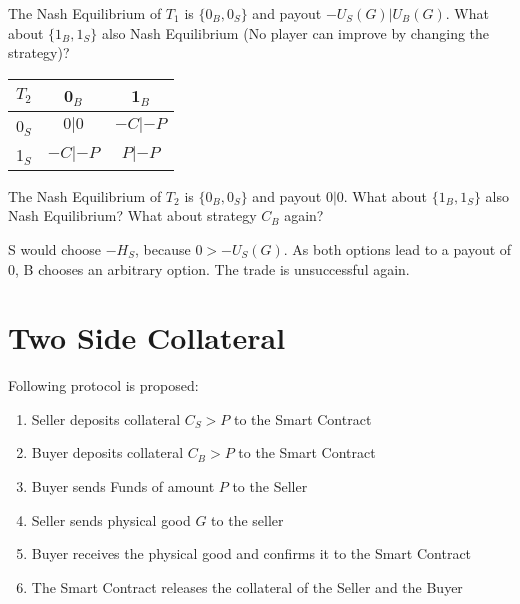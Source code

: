 \documentclass{cacthesis}
\begin{document}
The Nash Equilibrium of $T_1$ is $\{0_B, 0_S\}$ and payout $-U_S(G) | U_B(G)$. What about $\{1_B, 1_S\}$ also Nash Equilibrium (No player can improve by changing the strategy)? 

\begin{center}
\begin{tabular}{ c||c|c| }
$T_2$& 0$_B$ & 1$_B$   \\
\hline
\hline
0$_S$ & $0 | 0$ & $-C|-P$ \\
\hline
1$_S$ & $-C|-P$ & $P | -P$\\ 
\hline
\end{tabular}
\end{center}

The Nash Equilibrium of $T_2$ is $\{0_B, 0_S\}$ and payout $0 | 0$. What about $\{1_B, 1_S\}$ also Nash Equilibrium? What about strategy $C_B$ again?\newline

S would choose $-H_S$, because $0>-U_S(G)$.\newline
As both options lead to a payout of 0, B chooses an arbitrary option. The trade is unsuccessful again.


\section{Two Side Collateral}
Following protocol is proposed:
\begin{enumerate}
    \item Seller deposits collateral $C_S > P$ to the Smart Contract
    \item Buyer deposits collateral $C_B > P$ to the Smart Contract
    \item Buyer sends Funds of amount $P$ to the Seller
    \item Seller sends physical good $G$ to the seller 
    \item Buyer receives the physical good and confirms it to the Smart Contract
    \item The Smart Contract releases the collateral of the Seller and the Buyer
\end{enumerate}

\end{document}
